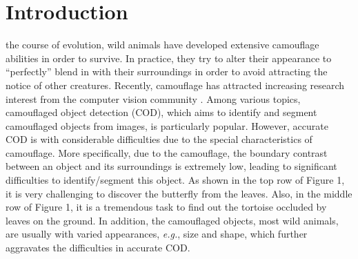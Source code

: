 \documentclass[lettersize,journal]{IEEEtran}
\newcommand{\CheckRmv}[1]{}
\newcommand{\figref}[1]{Figure 1}%
\newcommand{\CheckRmv}[1]{#1}
\newcommand{\figref}[1]{Fig.~\ref{#1}}%
\def\eg{\emph{e.g.}}
\begin{document}
\section{Introduction}\label{sec:introduction}

 the course of evolution, wild animals have developed extensive camouflage abilities in order to survive.
In practice, they try to alter their appearance to ``perfectly'' blend in with their surroundings in order to avoid attracting the notice of other creatures.
Recently, camouflage has attracted increasing research interest from the computer vision community \cite{anet,sinet,rethinking}.
Among various topics, camouflaged object detection (COD), which aims to identify and segment camouflaged objects from images, is particularly popular.
However, accurate COD is with considerable difficulties due to the special characteristics of camouflage.
More specifically, due to the camouflage, the boundary contrast between an object and its surroundings is extremely low, leading to significant difficulties to identify/segment this object.
As shown in the top row of \figref{fig:examples}, it is very challenging to discover {the butterfly from the leaves.
Also, in the middle row of \figref{fig:examples}, it is a tremendous task to find out the tortoise occluded by leaves on the ground.}
In addition, the camouflaged objects, most wild animals, are usually with varied appearances, \eg, size and shape, which further aggravates the difficulties in accurate COD.
\CheckRmv{
	\begin{figure}[t]
		\centering
		\texttt{[image: example.pdf]}
		\vspace{-5pt}
		\caption{We show three challenging camouflage scenarios (top to bottom) with indefinable boundary, occluded object, and multiple objects. Our model outperforms cutting-edge models, 
			SINet \protect\cite{sinet} and LSR\protect\cite{lsr}, in these challenging scenarios.}
		\label{fig:examples}
	\end{figure}
}
\end{document}

